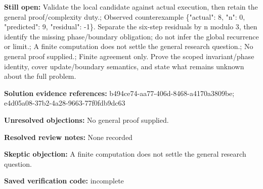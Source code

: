 \documentclass[11pt]{article}
\begin{document}
\textbf{Still open:} Validate the local candidate against actual execution, then retain the general proof/complexity duty.; Observed counterexample \{"actual": 8, "n": 0, "predicted": 9, "residual": -1\}. Separate the six-step residuals by n modulo 3, then identify the missing phase/boundary obligation; do not infer the global recurrence or limit.; A finite computation does not settle the general research question.; No general proof supplied.; Finite agreement only. Prove the scoped invariant/phase identity, cover update/boundary semantics, and state what remains unknown about the full problem.\par
\textbf{Solution evidence references:} b494ce74-aa77-406d-8468-a4170a3809be; e4d05a08-37b2-4a28-9663-77f0fdb9dc63\par
\textbf{Unresolved objections:} No general proof supplied.\par
\textbf{Resolved review notes:} None recorded\par
\textbf{Skeptic objection:} A finite computation does not settle the general research question.\par
\textbf{Saved verification code:} incomplete\par
\end{document}
